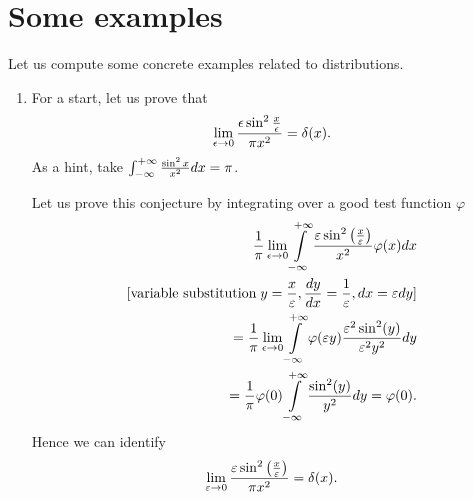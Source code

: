 \section{Some examples}

{
\color{blue}
\bexample

Let us compute some concrete examples related to distributions.
\begin{enumerate}
\item
For a start, let us prove that
\begin{equation}
\lim_{\epsilon \rightarrow 0}{\epsilon \sin^2 \frac{x}{\epsilon}\over \pi
 x^2}= \delta (x).\end{equation}
As a hint, take  $\int_{-\infty}^{+\infty} {\sin^2x\over x^2}dx =\pi $.

Let us prove this conjecture by integrating over a good test function $\varphi$
\begin{equation}
\begin{split}
   {1\over\pi}\lim_{\epsilon \rightarrow 0}\int\limits_{-\infty}^{+\infty}
   {\varepsilon\sin^2\left({x\over\varepsilon}\right)\over x^2} \varphi(x) dx
\\
 \textrm{[variable substitution}\;   y={x\over\varepsilon} , {dy\over dx}={1\over\varepsilon}, dx=\varepsilon dy
\textrm{]}
\\  =
  {1\over\pi}\lim_{\epsilon \rightarrow 0}
   \int\limits_{-\infty}^{+\infty}\varphi(\varepsilon y)
   {\varepsilon^2\sin^2(y)\over \varepsilon^2y^2}dy
\\  =    {1\over\pi}
   \varphi(0)\int\limits_{-\infty}^{+\infty}{\sin^2(y)\over y^2}dy
  =    \varphi(0).
\end{split}
\end{equation}
Hence we can identify
\begin{equation}
   \lim_{\varepsilon \rightarrow 0}{\varepsilon\sin^2 \left({x\over\varepsilon}\right)\over\pi x^2}=\delta(x).
\end{equation}


\end{enumerate}}

